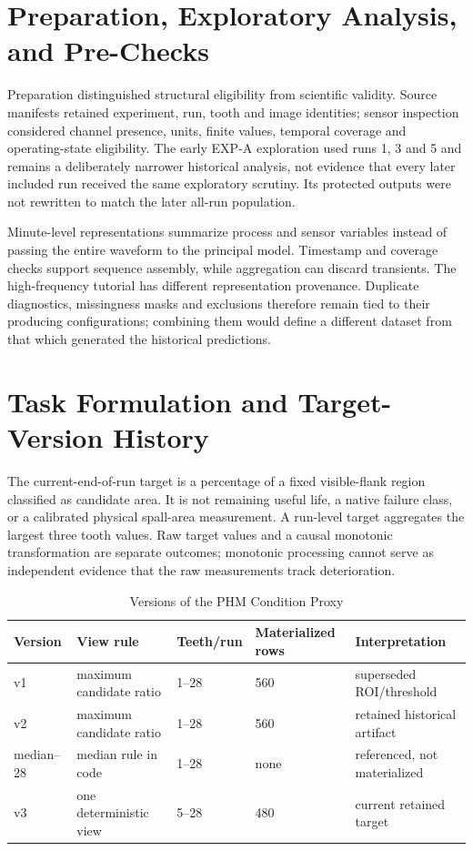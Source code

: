 \section{Preparation, Exploratory Analysis, and Pre-Checks}
Preparation distinguished structural eligibility from scientific validity. Source manifests retained experiment, run, tooth and image identities; sensor inspection considered channel presence, units, finite values, temporal coverage and operating-state eligibility. The early EXP-A exploration used runs 1, 3 and 5 and remains a deliberately narrower historical analysis, not evidence that every later included run received the same exploratory scrutiny. Its protected outputs were not rewritten to match the later all-run population.

Minute-level representations summarize process and sensor variables instead of passing the entire waveform to the principal model. Timestamp and coverage checks support sequence assembly, while aggregation can discard transients. The high-frequency tutorial has different representation provenance. Duplicate diagnostics, missingness masks and exclusions therefore remain tied to their producing configurations; combining them would define a different dataset from that which generated the historical predictions.

\section{Task Formulation and Target-Version History}
The current-end-of-run target is a percentage of a fixed visible-flank region classified as candidate area. It is not remaining useful life, a native failure class, or a calibrated physical spall-area measurement. A run-level target aggregates the largest three tooth values. Raw target values and a causal monotonic transformation are separate outcomes; monotonic processing cannot serve as independent evidence that the raw measurements track deterioration.

\begin{table}[htbp]
\caption{Versions of the PHM Condition Proxy}\label{tab:phm-target-lineage}
\centering\small
\begin{tabularx}{\textwidth}{@{}P{18mm}YP{18mm}P{23mm}Y@{}}\toprule
Version & View rule & Teeth/run & Materialized rows & Interpretation\\\midrule
v1 & maximum candidate ratio & 1--28 & 560 & superseded ROI/threshold\\
v2 & maximum candidate ratio & 1--28 & 560 & retained historical artifact\\
median--28 & median rule in code & 1--28 & none & referenced, not materialized\\
v3 & one deterministic view & 5--28 & 480 & current retained target\\\bottomrule
\end{tabularx}
\end{table}

